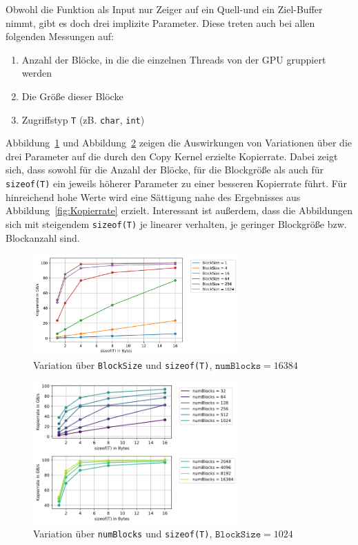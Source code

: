 \documentclass[11pt, abstract=on]{scrartcl}
\begin{document}
Obwohl die Funktion als Input nur Zeiger auf ein Quell-und ein Ziel-Buffer nimmt, gibt es doch drei implizite Parameter. Diese treten auch bei allen folgenden Messungen auf:
\begin{enumerate}
	\item Anzahl der Blöcke, in die die einzelnen Threads von der GPU gruppiert werden
	\item Die Größe dieser Blöcke
	\item Zugriffstyp \texttt{T} (zB. \texttt{char}, \texttt{int})
\end{enumerate}
 Abbildung~\ref{fig:CopyKernel1} und Abbildung~\ref{fig:CopyKernelBlocks} zeigen die Auswirkungen von Variationen über die drei Parameter auf die durch den Copy Kernel erzielte Kopierrate. Dabei zeigt sich, dass sowohl für die Anzahl der Blöcke, für die Blockgröße als auch für \texttt{sizeof(T)} ein jeweils höherer Parameter zu einer besseren Kopierrate führt. Für hinreichend hohe Werte wird eine Sättigung nahe des Ergebnisses aus Abbildung~\ref{fig:Kopierrate} erzielt. Interessant ist außerdem, dass die Abbildungen sich mit steigendem \texttt{sizeof(T)} je linearer verhalten, je geringer Blockgröße bzw. Blockanzahl sind.

\begin{figure} [htbp]
 	\centering
 		\includegraphics[width=0.7\textwidth]{Graph_CopyKernel1.png}
 	\caption{Variation über \texttt{BlockSize} und \texttt{sizeof(T)}, $\texttt{numBlocks} = 16384$}
 	\label{fig:CopyKernel1}
\end{figure}

\begin{figure} [htbp]
 	\centering
 		\includegraphics[width=0.7\textwidth]{Graph_CopyKernelBlocks.png}
 	\caption{Variation über \texttt{numBlocks} und \texttt{sizeof(T)}, $\texttt{BlockSize} = 1024$}
 	\label{fig:CopyKernelBlocks}
\end{figure}
\end{document}
